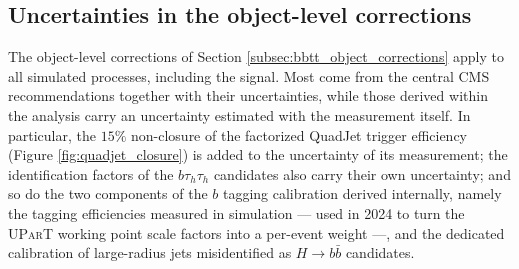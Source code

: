 




\subsection{Uncertainties in the object-level corrections}
%
The object-level corrections of Section \ref{subsec:bbtt_object_corrections} apply to all simulated processes, including the signal. Most come from the central CMS recommendations together with their uncertainties, while those derived within the analysis carry an uncertainty estimated with the measurement itself. In particular, the $15\%$ non-closure of the factorized QuadJet trigger efficiency (Figure \ref{fig:quadjet_closure}) is added to the uncertainty of its measurement; the identification factors of the $b\tau_h\tau_h$ candidates also carry their own uncertainty; and so do the two components of the $b$ tagging calibration derived internally, namely the tagging efficiencies measured in simulation — used in 2024 to turn the \textsc{UParT} working point scale factors into a per-event weight —, and the dedicated calibration of large-radius jets misidentified as $H\to b\bar{b}$ candidates.\medskip

